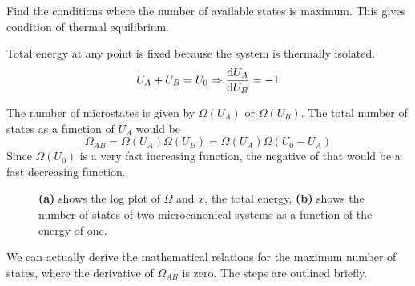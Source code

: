 \documentclass[12pt,chapterprefix=false,dvipsnames]{scrbook}
\theoremstyle{dotless}
\theoremstyle{definition}
\begin{document}
Find the conditions where the number of available states is
maximum. This gives condition of thermal equilibrium.

Total energy at any point is fixed because the system is
thermally isolated.
\begin{equation}
	U_A + U_B = U_0 \Rightarrow \dv{U_A}{U_B} = -1
\end{equation}

The number of microstates is given by $\Omega(U_A)$ or
$\Omega(U_B)$. The total number of states as a
function of $U_A$ would be
\begin{equation}
	\Omega_{AB}
	=
	\Omega\left(U_A\right)\Omega\left(U_B\right)
	=
	\Omega\left(U_A\right)\Omega\left(U_0-U_A\right)
\end{equation}
Since $\Omega\left(U_0\right)$ is a very fast increasing
function, the negative of that would be a fast decreasing
function.

\begin{figure}[htpb]
	\centering
	
	\caption{\textbf{(a)} shows the log plot of
		$\Omega$ and
		$x$, the total energy, \textbf{(b)} shows the number of states of two
		microcanonical systems as a function of the energy of one.}%
	\label{fig:energy_and_states}
\end{figure}

We can actually derive the mathematical relations for the
maximum number of states, where the derivative of
$\Omega_{AB}$ is zero. The steps are outlined briefly.
\end{document}
